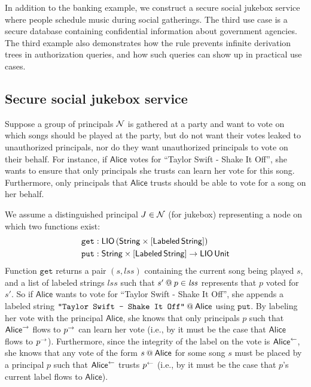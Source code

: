 In addition to the banking example, we construct a secure social jukebox service where people schedule music during social gatherings. The third use case is a secure database containing confidential information about government agencies. The third example also demonstrates how the  rule prevents infinite derivation trees in authorization queries, and how such queries can show up in practical use cases.

\subsection{Secure social jukebox service}\label{subsec:jukebox}
Suppose a group of principals $\Nameset$ is gathered at a party and want to vote on which songs should be played at the party, but do not want their votes leaked to unauthorized principals, nor do they want unauthorized principals to vote on their behalf.
For instance, if $\mathsf{Alice}$ votes for ``Taylor Swift - Shake It Off'', she wants to ensure that only principals she trusts can learn her vote for this song. Furthermore, only principals that $\mathsf{Alice}$ trusts should be able to vote for a song on her behalf.

We assume a distinguished principal $J \in \Nameset$ (for jukebox) representing a node on which two functions exist:
\begin{align*}
\mathtt{get}&: \liotype{(\pair{\String}{\listtype{\labeled{\String}}})}\\
\mathtt{put}&: \pair{\String}{\listtype{\labeled{\String}}} \to \liotype{\unit}
\end{align*}
Function $\mathtt{get}$ returns a pair $(\mathit{s}, \mathit{lss})$ containing the current song being played $s$, and a list of labeled strings $\mathit{lss}$ such that $\lb{p}{s'} \in \mathit{lss}$ represents that $p$ voted for $s'$. So if $\mathsf{Alice}$ wants to vote for ``Taylor Swift - Shake It Off'', she appends a labeled string $\lb{\mathsf{Alice}}{\texttt{"Taylor Swift - Shake It Off"}}$ using $\mathtt{put}$. By labeling her vote with the principal $\mathsf{Alice}$, she knows that only principals $p$ such that $\conf{\mathsf{Alice}}$ flows to $\conf{p}$ can learn her vote (i.e., by  it must be the case that $\mathsf{Alice}$ flows to $\conf{p}$). Furthermore, since the integrity of the label on the vote is $\integ{\mathsf{Alice}}$, she knows that any vote of the form $\lb{\mathsf{Alice}}{s}$ for some song $s$ must be placed by a principal $p$ such that $\integ{\mathsf{Alice}}$ trusts $\integ{p}$ (i.e., by  it must be the case that $p$'s current label flows to $\mathsf{Alice}$).


